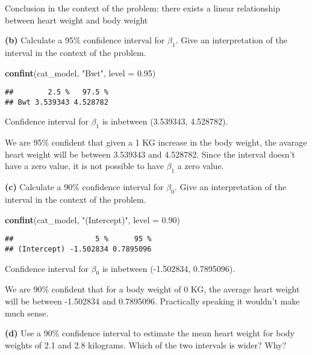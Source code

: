 \documentclass[
]{article}
\newenvironment{Shaded}{\begin{snugshade}}{\end{snugshade}}
\newcommand{\DataTypeTok}[1]{\textcolor[rgb]{0.13,0.29,0.53}{#1}}
\newcommand{\FloatTok}[1]{\textcolor[rgb]{0.00,0.00,0.81}{#1}}
\newcommand{\KeywordTok}[1]{\textcolor[rgb]{0.13,0.29,0.53}{\textbf{#1}}}
\newcommand{\NormalTok}[1]{#1}
\newcommand{\StringTok}[1]{\textcolor[rgb]{0.31,0.60,0.02}{#1}}
\begin{document}
Conclusion in the context of the problem: there exists a linear
relationship between heart weight and body weight

\textbf{(b)} Calculate a 95\% confidence interval for \(\beta_1\). Give
an interpretation of the interval in the context of the problem.

\begin{Shaded}
\begin{Highlighting}[]
\KeywordTok{confint}\NormalTok{(cat_model, }\StringTok{"Bwt"}\NormalTok{, }\DataTypeTok{level =} \FloatTok{0.95}\NormalTok{)}
\end{Highlighting}
\end{Shaded}

\begin{verbatim}
##        2.5 %   97.5 %
## Bwt 3.539343 4.528782
\end{verbatim}

Confidence interval for \(\beta_1\) is inbetween (3.539343, 4.528782).

We are 95\% confident that given a 1 KG increase in the body weight, the
avarage heart weight will be between 3.539343 and 4.528782. Since the
interval doesn't have a zero value, it is not possible to have
\(\beta_1\) a zero value.

\textbf{(c)} Calculate a 90\% confidence interval for \(\beta_0\). Give
an interpretation of the interval in the context of the problem.

\begin{Shaded}
\begin{Highlighting}[]
\KeywordTok{confint}\NormalTok{(cat_model, }\StringTok{"(Intercept)"}\NormalTok{, }\DataTypeTok{level =} \FloatTok{0.90}\NormalTok{)}
\end{Highlighting}
\end{Shaded}

\begin{verbatim}
##                   5 %      95 %
## (Intercept) -1.502834 0.7895096
\end{verbatim}

Confidence interval for \(\beta_0\) is inbetween (-1.502834, 0.7895096).

We are 90\% confident that for a body weight of 0 KG, the average heart
weight will be between -1.502834 and 0.7895096. Practically speaking it
wouldn't make much sense.

\textbf{(d)} Use a 90\% confidence interval to estimate the mean heart
weight for body weights of 2.1 and 2.8 kilograms. Which of the two
intervals is wider? Why?
\end{document}
